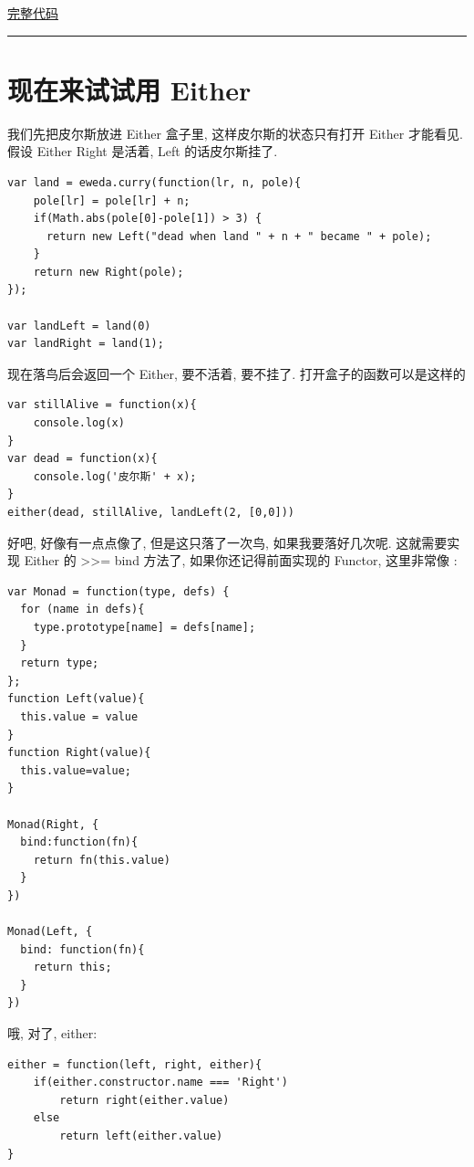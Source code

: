 \documentclass[a5paper]{book}
\begin{document}
\href{http://jsbin.com/pozim/8/watch?js,console,output}{完整代码}

\rule{\linewidth}{0.5pt}

\section{现在来试试用 Either}
\label{sec:orgheadline38}

我们先把皮尔斯放进 Either 盒子里, 这样皮尔斯的状态只有打开 Either
才能看见. 假设 Either Right 是活着, Left 的话皮尔斯挂了.

\begin{verbatim}
var land = eweda.curry(function(lr, n, pole){
    pole[lr] = pole[lr] + n;
    if(Math.abs(pole[0]-pole[1]) > 3) {
      return new Left("dead when land " + n + " became " + pole);
    }
    return new Right(pole);
});

var landLeft = land(0)
var landRight = land(1);
\end{verbatim}

现在落鸟后会返回一个 Either, 要不活着, 要不挂了.
打开盒子的函数可以是这样的

\begin{verbatim}
var stillAlive = function(x){
    console.log(x)
}
var dead = function(x){
    console.log('皮尔斯' + x);
}
either(dead, stillAlive, landLeft(2, [0,0]))
\end{verbatim}

好吧, 好像有一点点像了, 但是这只落了一次鸟, 如果我要落好几次呢.
这就需要实现 Either 的 >>= bind 方法了, 如果你还记得前面实现的 Functor,
这里非常像 :

\begin{verbatim}
var Monad = function(type, defs) {
  for (name in defs){
    type.prototype[name] = defs[name];
  }
  return type;
};
function Left(value){
  this.value = value
}
function Right(value){
  this.value=value;
}

Monad(Right, {
  bind:function(fn){
    return fn(this.value)
  }
})

Monad(Left, {
  bind: function(fn){
    return this;
  }
})
\end{verbatim}

哦, 对了, either:

\begin{verbatim}
either = function(left, right, either){
    if(either.constructor.name === 'Right')
        return right(either.value)
    else
        return left(either.value)
}
\end{verbatim}
\end{document}
